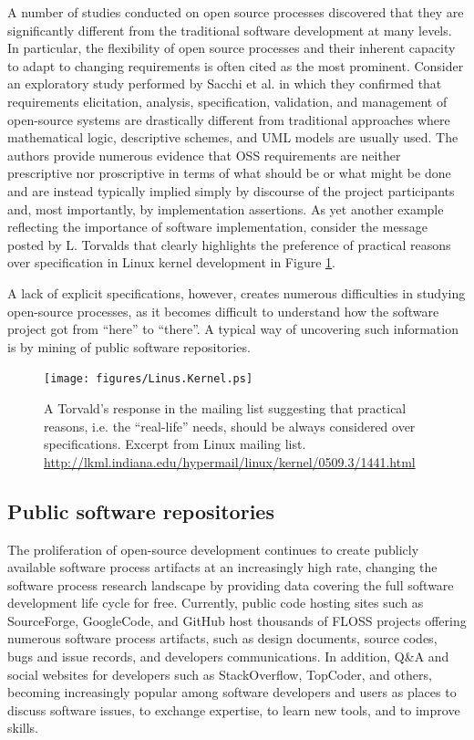 A number of studies conducted on open source processes discovered that they are significantly 
different from the traditional software development at many levels. In particular, the flexibility 
of open source processes and their inherent capacity to adapt to changing requirements is often 
cited as the most prominent. 
Consider an exploratory study performed by Sacchi et al. \cite{citeulike:342840} in which they 
confirmed that requirements elicitation, analysis, specification, validation, and management of 
open-source systems are drastically different from traditional approaches where mathematical 
logic, descriptive schemes, and UML models are usually used. 
The authors provide numerous evidence that OSS requirements are neither prescriptive nor 
proscriptive in terms of what should be or what might be done and are instead typically implied simply 
by discourse of the project participants and, most importantly, by implementation assertions.
As yet another example reflecting the importance of software implementation, consider the message 
posted by L. Torvalds that clearly highlights the preference of practical reasons over specification 
in Linux kernel development in Figure \ref{fig:kernel}.

A lack of explicit specifications, however, creates numerous difficulties in studying open-source processes, 
as it becomes difficult to understand how the software project got from ``here'' to ``there''. 
A typical way of uncovering such information is by mining of public software repositories.

\begin{figure}[ht!]
   \centering
   \texttt{[image: figures/Linus.Kernel.ps]}
   \caption{A Torvald's response in the mailing list suggesting that practical reasons, 
   i.e. the ``real-life'' needs, should be always considered over specifications.
   Excerpt from Linux mailing list. \url{http://lkml.indiana.edu/hypermail/linux/kernel/0509.3/1441.html}}
   \label{fig:kernel}
\end{figure}

\subsection{Public software repositories}
The proliferation of open-source development continues to create publicly available software process 
artifacts at an increasingly high rate, changing the software process research landscape by providing 
data covering the full software development life cycle for free. 
Currently, public code hosting sites such as SourceForge, GoogleCode, and GitHub host thousands of FLOSS 
projects offering numerous software process artifacts, such as design documents, source codes, bugs and 
issue records, and developers communications.
In addition, Q\&A and social websites for developers such as StackOverflow, TopCoder, and others, becoming 
increasingly popular among software developers and users as places to discuss software issues, 
to exchange expertise, to learn new tools, and to improve skills.

